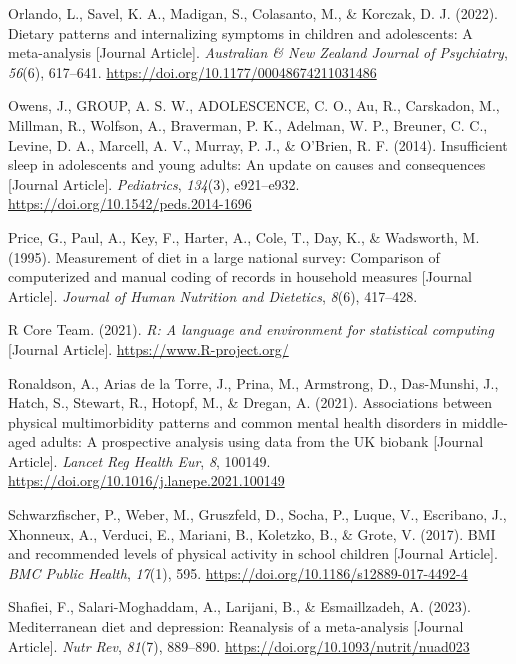 \documentclass[
  letterpaper,
  DIV=11,
  numbers=noendperiod]{scrreport}
\newlength{\cslhangindent}
\newenvironment{CSLReferences}[2] %
 {\begin{list}{}{%
  \setlength{\itemindent}{0pt}
  \setlength{\leftmargin}{0pt}
  \setlength{\parsep}{0pt}
  \ifodd #1
   \setlength{\leftmargin}{\cslhangindent}
   \setlength{\itemindent}{-1\cslhangindent}
  \fi
  \setlength{\itemsep}{#2\baselineskip}}}
 {\end{list}}
\begin{document}
\begin{CSLReferences}{1}{0}
Orlando, L., Savel, K. A., Madigan, S., Colasanto, M., \& Korczak, D. J.
(2022). Dietary patterns and internalizing symptoms in children and
adolescents: A meta-analysis {[}Journal Article{]}. \emph{Australian \&
New Zealand Journal of Psychiatry}, \emph{56}(6), 617--641.
\url{https://doi.org/10.1177/00048674211031486}

Owens, J., GROUP, A. S. W., ADOLESCENCE, C. O., Au, R., Carskadon, M.,
Millman, R., Wolfson, A., Braverman, P. K., Adelman, W. P., Breuner, C.
C., Levine, D. A., Marcell, A. V., Murray, P. J., \& O'Brien, R. F.
(2014). Insufficient sleep in adolescents and young adults: An update on
causes and consequences {[}Journal Article{]}. \emph{Pediatrics},
\emph{134}(3), e921--e932. \url{https://doi.org/10.1542/peds.2014-1696}

Price, G., Paul, A., Key, F., Harter, A., Cole, T., Day, K., \&
Wadsworth, M. (1995). Measurement of diet in a large national survey:
Comparison of computerized and manual coding of records in household
measures {[}Journal Article{]}. \emph{Journal of Human Nutrition and
Dietetics}, \emph{8}(6), 417--428.

R Core Team. (2021). \emph{R: A language and environment for statistical
computing} {[}Journal Article{]}. \url{https://www.R-project.org/}

Ronaldson, A., Arias de la Torre, J., Prina, M., Armstrong, D.,
Das-Munshi, J., Hatch, S., Stewart, R., Hotopf, M., \& Dregan, A.
(2021). Associations between physical multimorbidity patterns and common
mental health disorders in middle-aged adults: A prospective analysis
using data from the UK biobank {[}Journal Article{]}. \emph{Lancet Reg
Health Eur}, \emph{8}, 100149.
\url{https://doi.org/10.1016/j.lanepe.2021.100149}

Schwarzfischer, P., Weber, M., Gruszfeld, D., Socha, P., Luque, V.,
Escribano, J., Xhonneux, A., Verduci, E., Mariani, B., Koletzko, B., \&
Grote, V. (2017). BMI and recommended levels of physical activity in
school children {[}Journal Article{]}. \emph{BMC Public Health},
\emph{17}(1), 595. \url{https://doi.org/10.1186/s12889-017-4492-4}

Shafiei, F., Salari-Moghaddam, A., Larijani, B., \& Esmaillzadeh, A.
(2023). Mediterranean diet and depression: Reanalysis of a meta-analysis
{[}Journal Article{]}. \emph{Nutr Rev}, \emph{81}(7), 889--890.
\url{https://doi.org/10.1093/nutrit/nuad023}


\end{CSLReferences}
\end{document}
